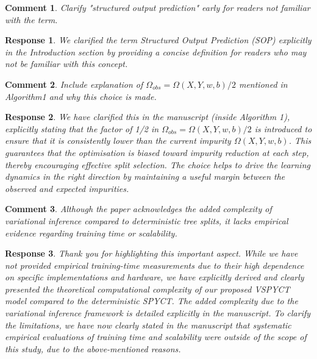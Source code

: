 \documentclass [a4paper,11pt]{article}
\theoremstyle{blue}
\newtheorem{question}{Comment}[section]
\theoremstyle{blue}
\theoremstyle{note}
\newtheorem{answer}{Response}[section]
\theoremstyle{note}
\begin{document}
\begin{question}

Clarify "structured output prediction" early for readers not familiar with the term.

\end{question}

\begin{answer}

We clarified the term Structured Output Prediction (SOP) explicitly in the Introduction section by providing a concise definition for readers who may not be familiar with this concept.

\end{answer}

\begin{question}

Include explanation of $\Omega_{obs} = \Omega (X,Y,w,b)/2$ mentioned in Algorithm1 and why this choice is made.

\end{question}

\begin{answer}

We have clarified this in the manuscript (inside Algorithm 1), explicitly stating that the factor of 1/2 in $\Omega_{obs} = \Omega (X,Y,w,b)/2$ is introduced to ensure that it is consistently lower than the current impurity $\Omega (X,Y,w,b)$. This guarantees that the optimisation is biased toward impurity reduction at each step, thereby encouraging effective split selection. The choice helps to drive the learning dynamics in the right direction by maintaining a useful margin between the observed and expected impurities.

\end{answer}

\begin{question}

Although the paper acknowledges the added complexity of variational inference compared to deterministic tree splits, it lacks empirical evidence regarding training time
or scalability.

\end{question}

\begin{answer}

Thank you for highlighting this important aspect. While we have not provided empirical training-time measurements due to their high dependence on specific implementations and hardware, we have explicitly derived and clearly presented the theoretical computational complexity of our proposed VSPYCT model compared to the deterministic SPYCT. The added complexity due to the variational inference framework is detailed explicitly in the manuscript. To clarify the limitations, we have now clearly stated in the manuscript that systematic empirical evaluations of training time and scalability were outside of the scope of this study, due to the above-mentioned reasons.

\end{answer}
\end{document}
